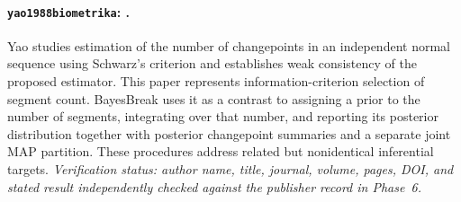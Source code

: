 \paragraph{\texttt{yao1988biometrika}: \citet{yao1988biometrika}.}
Yao studies estimation of the number of changepoints in an independent normal sequence using Schwarz's criterion and establishes weak consistency of the proposed estimator. This paper represents information-criterion selection of segment count. BayesBreak uses it as a contrast to assigning a prior to the number of segments, integrating over that number, and reporting its posterior distribution together with posterior changepoint summaries and a separate joint MAP partition. These procedures address related but nonidentical inferential targets. \textit{Verification status: author name, title, journal, volume, pages, DOI, and stated result independently checked against the publisher record in Phase~6.}
